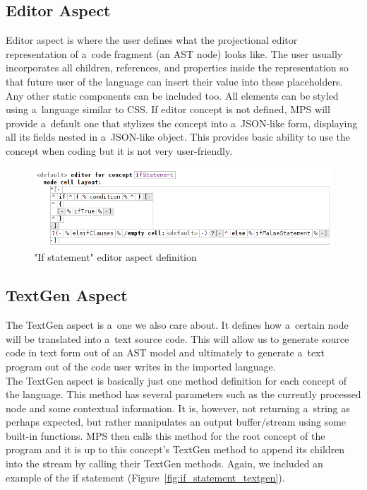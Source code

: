 \subsection{Editor Aspect}
\label{chap:about_editor_aspect}

Editor aspect is where the user defines what the projectional editor representation of a~code fragment (an AST node) looks like.
The user usually incorporates all children, references, and properties inside the representation so that future user of the language can insert their value into these placeholders.
Any other static components can be included too.
All elements can be styled using a~language similar to CSS.
If editor concept is not defined, MPS will provide a~default one that stylizes the concept into a~JSON-like form, displaying all its fields nested in a~JSON-like object.
This provides basic ability to use the concept when coding but it is not very user-friendly.

\begin{figure}[ht]
	\centering
	\includegraphics[width=\textwidth]{./img/if_statement_editor_definition.png}
	\caption{"If statement" editor aspect definition}
	\label{fig:if_editor_definition}
\end{figure}

\subsection{TextGen Aspect}
The TextGen aspect is a~one we also care about.
It defines how a~certain node will be translated into a~text source code.
This will allow us to generate source code in text form out of an AST model and ultimately to generate a~text program out of the code user writes in the imported language.
\\

The TextGen aspect is basically just one method definition for each concept of the language.
This method has several parameters such as the currently processed node and some contextual information.
It is, however, not returning a~string as perhaps expected, but rather manipulates an output buffer/stream using some built-in functions.
MPS then calls this method for the root concept of the program and it is up to this concept's TextGen method to append its children into the stream by calling their TextGen methods.
Again, we included an example of the if statement (Figure~\ref{fig:if_statement_textgen}).

